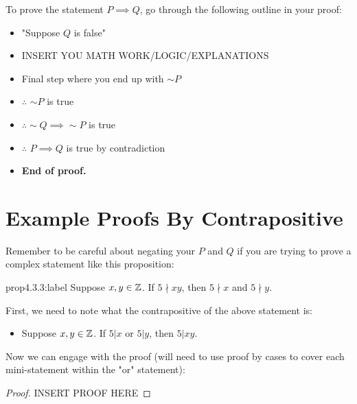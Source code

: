 To prove the statement $P\implies Q$, go through the following outline in your proof:

\begin{itemize}
    \item "Suppose $Q$ is false"
    \item INSERT YOU MATH WORK/LOGIC/EXPLANATIONS
    \item Final step where you end up with $\sim P$
    \item $\therefore$ $\sim P$ is true
    \item $\therefore \sim Q \implies \sim P$ is true
    \item $\therefore$ $P \implies Q$ is true by contradiction
    \item \textbf{End of proof.} 
\end{itemize}


\section{Example Proofs By Contrapositive}

Remember to be careful about negating your $P$ and $Q$ if you are trying to prove a complex statement like this proposition:

\begin{proposition}{prop4.3.3:label}
    Suppose $x,y \in \mathbb{Z}$. If $5 \nmid xy$, then $5 \nmid x$ and $5 \nmid y$.
\end{proposition}

First, we need to note what the contrapositive of the above statement is:

\begin{itemize}
    \item Suppose $x,y \in \mathbb{Z}$. If $5|x$ or $5|y$, then $5|xy$.
\end{itemize}

Now we can engage with the proof (will need to use proof by cases to cover each mini-statement within the "or" statement):

\begin{proof}
    INSERT PROOF HERE
\end{proof}